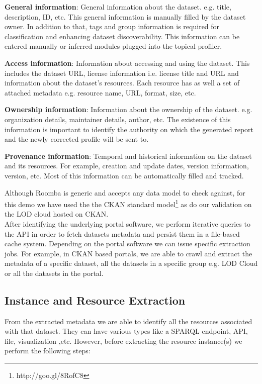 \documentclass{sig-alternate}
\begin{document}
\textbf{General information}: General information about the dataset. e.g. title, description, ID, etc. This general information is manually filled by the dataset owner. In addition to that, tags and group information is required for classification and enhancing dataset discoverability. This information can be entered manually or inferred modules plugged into the topical profiler.

\textbf{Access information}: Information about accessing and using the dataset. This includes the dataset URL, license information i.e. license title and URL and information about the dataset's resources. Each resource has as well a set of attached metadata e.g. resource name, URL, format, size, etc.

\textbf{Ownership information}: Information about the ownership of the dataset. e.g. organization details, maintainer details, author, etc. The existence of this information is important to identify the authority on which the generated report and the newly corrected profile will be sent to.

\textbf{Provenance information}: Temporal and historical information on the dataset and its resources. For example, creation and update dates, version information, version, etc. Most of this information can be automatically filled and tracked.

Although Roomba is generic and accepts any data model to check against, for this demo we have used the the CKAN standard model\footnote{http://goo.gl/8RofC8} as do our validation on the LOD cloud hosted on CKAN.\\

After identifying the underlying portal software, we perform iterative queries to the API in order to fetch datasets metadata and persist them in a file-based cache system.
Depending on the portal software we can issue specific extraction jobs. For example, in CKAN based portals, we are able to crawl and extract the metadata of a specific dataset, all the datasets in a specific group e.g. LOD Cloud or all the datasets in the portal.

\subsection{Instance and Resource Extraction}

From the extracted metadata we are able to identify all the resources associated with that dataset. They can have various types like a SPARQL endpoint, API, file, visualization ,etc. However, before extracting the resource instance(s) we perform the following steps:
\end{document}
